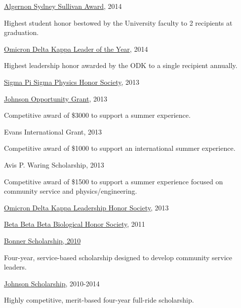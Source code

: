 \documentclass[10pt]{article}
\begin{document}
\begin{innerlist}
\item \href{https://www.wlu.edu/university-registrar/policies-and-procedures/university-honors-board/sullivan-award}{Algernon Sydney Sullivan Award}, 2014
\begin{innerlist}
\item Highest student honor bestowed by the University faculty to 2 recipients at graduation.
\end{innerlist}
\item \href{http://odk.org/circle/wlu/}{Omicron Delta Kappa Leader of the Year}, 2014
\begin{innerlist}
\item Highest leadership honor awarded by the ODK to a single recipient annually.
\end{innerlist}
\item \href{https://www.wlu.edu/physics-and-engineering-department/opportunities-for-students/physics-honor-society}{Sigma Pi Sigma Physics Honor Society}, 2013
\item \href{https://www.wlu.edu/johnson-program/johnson-opportunity-grants/past-recipients/2013-johnson-opportunity-grant-winners/alvin-thomas-14}{Johnson Opportunity Grant}, 2013
\begin{innerlist}
\item Competitive award of \$3000 to support a summer experience.
\end{innerlist}
\item Evans International Grant, 2013
\begin{innerlist}
\item Competitive award of \$1000 to support an international summer experience.
\end{innerlist}
\item Avis P. Waring Scholarship, 2013
\begin{innerlist}
\item Competitive award of \$1500 to support a summer experience focused on community service and physics/engineering.
\end{innerlist}
\item \href{https://www.wlu.edu/university-registrar/policies-and-procedures/university-honors-board/omicron-delta-kappa}{Omicron Delta Kappa Leadership Honor Society}, 2013
\item \href{http://www2.wlu.edu/x36446.xml}{Beta Beta Beta Biological Honor Society}, 2011
\item \href{https://www.wlu.edu/shepherd-program/community-based-learning-opportunities/bonner-program}{Bonner Scholarship, 2010}
\begin{innerlist}
\item Four-year, service-based scholarship designed to develop community service leaders.
\end{innerlist}
\item \href{https://www.wlu.edu/johnson-program/the-johnson-scholarship}{Johnson Scholarship}, 2010-2014
\begin{innerlist}
\item Highly competitive, merit-based four-year full-ride scholarship.
\end{innerlist}


\end{innerlist}
\end{document}
